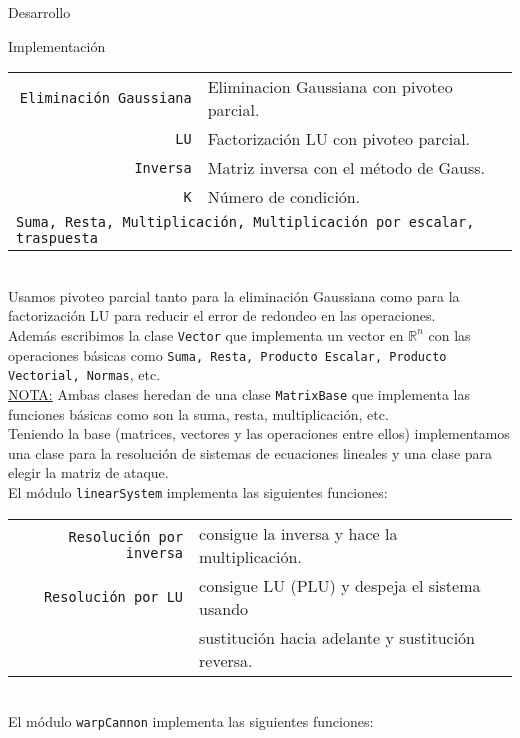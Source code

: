 \begin{section}{Desarrollo}
\begin{subsection}{Implementación}
		\begin{tabular}{rl}
			\texttt{Eliminación Gaussiana} & Eliminacion Gaussiana con pivoteo parcial.\\
			\texttt{LU} & Factorización LU con pivoteo parcial.\\
			\texttt{Inversa} & Matriz inversa con el método de Gauss.\\
			\texttt{K} & Número de condición.\\
			\multicolumn{2}{l}{
				\texttt{Suma, Resta, Multiplicación, Multiplicación por escalar, traspuesta}
			}
		\end{tabular}\\
		
		Usamos pivoteo parcial tanto para la eliminación Gaussiana como para la factorización LU para reducir el error de redondeo en las operaciones.\\
		
		Además escribimos la clase \texttt{Vector} que implementa un vector en $\mathbb{R}^n$ con las operaciones básicas como \texttt{Suma, Resta,
		Producto Escalar, Producto Vectorial, Normas}, etc.\\
		
		\underline{NOTA:} Ambas clases heredan de una clase \texttt{MatrixBase} que implementa las funciones básicas como son la suma, resta, multiplicación, etc.\\
		
		Teniendo la base (matrices, vectores y las operaciones entre ellos) implementamos una clase para la resolución de sistemas de ecuaciones lineales y una clase para elegir la matriz de ataque.\\
		
		El módulo \texttt{linearSystem} implementa las siguientes funciones:\\
		
		\begin{tabular}{rl}
			\texttt{Resolución por inversa} & consigue la inversa y hace la multiplicación.\\
			\texttt{Resolución por LU} & consigue LU (PLU) y despeja el sistema usando\\
									   & sustitución hacia adelante y sustitución reversa.\\
		\end{tabular}\\
		
		El módulo \texttt{warpCannon} implementa las siguientes funciones:\\
		

\end{subsection}
\end{section}
